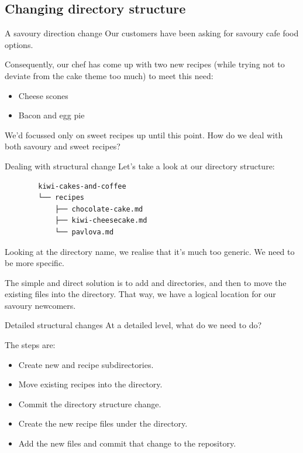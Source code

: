 \subsection{Changing directory structure}

\begin{frame}[fragile]{A savoury direction change}
    Our customers have been asking for savoury cafe food options.

    Consequently, our chef has come up with two new recipes (while trying
    not to deviate from the cake theme too much) to meet this need:
    \begin{itemize}
        \item Cheese scones
        \item Bacon and egg pie
    \end{itemize}

    We'd focussed only on sweet recipes up until this point.  How do we deal
    with both savoury and sweet recipes?
\end{frame}

\begin{frame}[fragile]{Dealing with structural change}
    Let's take a look at our directory structure:
    \begin{verbatim}
        kiwi-cakes-and-coffee
        └── recipes
            ├── chocolate-cake.md
            ├── kiwi-cheesecake.md
            └── pavlova.md
    \end{verbatim}
    Looking at the  directory name, we realise that it's much
    too generic.  We need to be more specific.

    The simple and direct solution is to add  and
     directories, and then to move the existing files into
    the  directory.  That way, we have a logical location for
    our savoury newcomers.
\end{frame}

\begin{frame}[fragile]{Detailed structural changes}
    At a detailed level, what do we need to do?

    The steps are:
    \begin{itemize}
        \item Create new  and  recipe
            subdirectories.
        \item Move existing recipes into the 
            directory.
        \item Commit the directory structure change.
        \item Create the new recipe files under the 
            directory.
        \item Add the new files and commit that change to the repository.
    \end{itemize}
\end{frame}


